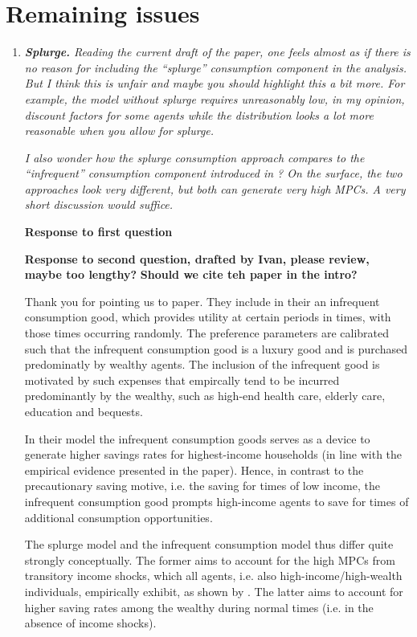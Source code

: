 \documentclass[12pt,letterpaper,english]{article}
\begin{document}
\section{Remaining issues}
\begin{enumerate}
	
\item \textit{\textbf{Splurge.} Reading the current draft of the paper, one feels almost as if there is	no reason for including the ``splurge'' consumption component in the analysis. But I think this is unfair and maybe you should highlight this a bit more. For example, the model without splurge requires unreasonably low, in my opinion, discount factors	for some agents while the distribution looks a lot more reasonable when you allow for splurge.}

\textit{I also wonder how the splurge consumption approach compares to the ``infrequent'' consumption component introduced in \citet{melcangi2024stock}? On the surface, the two approaches look very different, but both can generate very	high MPCs. A very short discussion would suffice.}

\noindent \textbf{Response to first question} 

\textbf{Response to second question, drafted by Ivan, please review, maybe too lengthy?} \textbf{Should we cite teh paper in the intro?} 

Thank you for pointing us to \citet{melcangi2024stock} paper. They include in their an infrequent consumption good, which provides utility at certain periods in times, with those times occurring randomly. The preference parameters are calibrated such that the infrequent consumption good is a luxury good and is purchased predominatly by wealthy agents. The inclusion of the infrequent good is motivated by such expenses that empircally tend to be incurred predominantly by the wealthy, such as high-end health care, elderly care, education and bequests.

In their model the infrequent consumption goods serves as a device to generate higher savings rates for highest-income households (in line with the empirical evidence presented in the paper). Hence, in contrast to the precautionary saving motive, i.e. the saving for times of low income, the infrequent consumption good prompts high-income agents to save for times of additional consumption opportunities.

The splurge model and the infrequent consumption model thus differ quite strongly conceptually. The former aims to account for the high MPCs from transitory income shocks, which all agents, i.e. also high-income/high-wealth individuals, empirically exhibit, as shown by \citet{fagereng_mpc_2021}. The latter aims to account for higher saving rates among the wealthy during normal times (i.e. in the absence of income shocks).


\end{enumerate}
\end{document}
